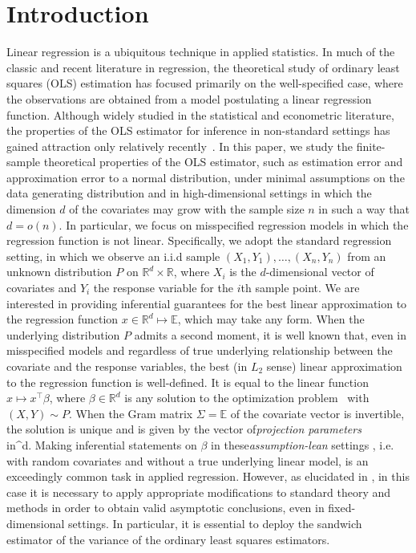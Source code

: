 \documentclass{article}
\begin{document}
\section{Introduction}
Linear regression is a ubiquitous technique in applied statistics. In much of the classic and recent literature in regression, the theoretical study of ordinary least squares (OLS) estimation has focused primarily on the well-specified case, where the observations are obtained from a model postulating a linear regression function. Although widely studied in the statistical and econometric literature, the properties of the OLS estimator for inference in non-standard settings has gained attraction only relatively recently~\citep{Buja14,Buja16,Uniform:Kuch18}.
In this paper, we study the finite-sample theoretical properties of the OLS estimator, such as estimation error and approximation error to a normal distribution, under minimal assumptions on the data generating distribution and in high-dimensional settings in which the dimension $d$ of the covariates may grow with the sample size $n$ in such a way that $d = o(n)$. In particular, we focus on misspecified regression models in which the regression function is not linear.
Specifically, we adopt the standard regression setting,
in which we observe an i.i.d sample $(X_1,Y_1),\ldots, (X_n,Y_n)$ from an unknown distribution $P$ on $\mathbb{R}^d \times \mathbb{R}$, where $X_i$ is the $d$-dimensional vector of covariates and $Y_i$ the response variable for the $i$th sample point.
We are interested in providing inferential guarantees for the best linear approximation to the
regression function $x \in \mathbb{R}^d \mapsto \mathbb{E}$, which may take any form.
When the underlying
distribution $P$ admits a second moment, it is well known \citep{Buja14} that, even in misspecified models and regardless of true underlying relationship between the covariate and the response variables, the best (in $L_2$ sense) linear approximation to the regression function is well-defined. It is equal to the linear function
$x \mapsto x^\top \beta$, where $\beta \in \mathbb{R}^d$ is any solution to the optimization problem
\,
\]
with $(X,Y) \sim P$.
When the Gram matrix $\Sigma
= \mathbb{E}$ of the covariate vector is invertible, the solution is unique and is given by the vector of{\it projection parameters}
\\in{}^d.
\]
Making inferential statements on $\beta$ in these{\it assumption-lean} settings \citep{Buja14}, i.e. with random covariates and without a true underlying linear model, is an exceedingly common task in applied regression. However, as elucidated in \cite{Buja14}, in this case it is necessary to apply appropriate modifications to standard theory and methods in order to obtain valid asymptotic conclusions, even in fixed-dimensional settings. In particular, it is essential to deploy the sandwich estimator \citep{White1980,Buja14} of the variance of the ordinary least squares estimators.
\end{document}
